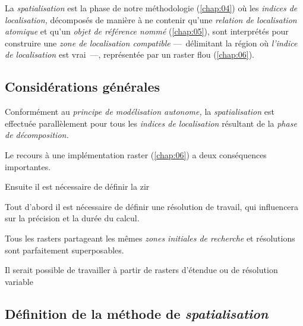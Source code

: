 La \emph{spatialisation} est la phase de notre méthodologie (\autoref{chap:04}) où les \emph{indices de localisation,} décomposés de manière à ne contenir qu'une \emph{relation de localisation atomique} et qu'un \emph{objet de référence nommé} (\autoref{chap:05}), sont interprétés pour construire une \emph{zone de localisation compatible} ---~délimitant la région où \emph{l'indice de localisation} est vrai~---, représentée par un raster flou (\autoref{chap:06}).

\subsection{Considérations générales}


Conformément au \emph{principe de modélisation autonome,} la \emph{spatialisation} est effectuée parallèlement pour tous les \emph{indices de localisation} résultant de la \emph{phase de décomposition.} 

Le recours à une implémentation raster (\autoref{chap:06}) a deux conséquences importantes. 

Ensuite il est nécessaire de définir la \ac{zir}

Tout d'abord il est nécessaire de définir une résolution de travail, qui influencera sur la précision et la durée du calcul.

Tous les rasters partageant les mêmes \emph{zones initiales de recherche} et résolutions sont parfaitement superposables.

%
Il serait possible de travailler à partir de rasters d'étendue ou de résolution variable




\subsection{Définition de la méthode de \emph{spatialisation}}

